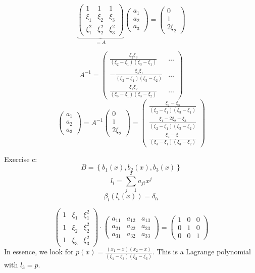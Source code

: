 \documentclass[a4paper]{article}
\theoremstyle{definition}
\newcommand\set[1]{\left\{#1\right\}}
\begin{document}
\[
  \underbrace{\begin{pmatrix}
    1 & 1 & 1 \\
    \xi_1 & \xi_2 & \xi_3 \\
    \xi_1^2 & \xi_2^2 & \xi_3^2
  \end{pmatrix}}_{= A}
  \begin{pmatrix} a_1 \\ a_2 \\ a_3 \end{pmatrix}
  = \begin{pmatrix} 0 \\ 1 \\ 2\xi_2 \end{pmatrix}
\]


\[
  A^{-1} = \begin{pmatrix}
    \frac{\xi_2 \xi_3}{(\xi_2 - \xi_1)(\xi_3 - \xi_1)} & \dots \\
    -\frac{\xi_3 \xi_1}{(\xi_2 - \xi_1)(\xi_3 - \xi_2)} & \dots \\
    \frac{\xi_1 \xi_2}{(\xi_3 - \xi_1)(\xi_3 - \xi_2)} & \dots
  \end{pmatrix}
\]
\[
  \begin{pmatrix} a_1 \\ a_2 \\ a_3 \end{pmatrix}
  = A^{-1} \begin{pmatrix} 0 \\ 1 \\ 2 \xi_2 \end{pmatrix}
  = \begin{pmatrix}
    \frac{\xi_2 - \xi_3}{(\xi_2 - \xi_1)(\xi_3 - \xi_1)} \\
    \frac{\xi_1 - 2\xi_2 + \xi_3}{(\xi_2 - \xi_1)(\xi_3 - \xi_2)} \\
    \frac{\xi_2 - \xi_1}{(\xi_3 - \xi_1)(\xi_3 - \xi_2)}
  \end{pmatrix}
\]

Exercise c:
\[ B = \set{b_1(x), b_2(x), b_3(x)} \]
\[ l_i = \sum_{j=1}^2 a_{ji} x^j \]
\[ \beta_l(l_i(x)) = \delta_{li} \]

\[
  \begin{pmatrix}
    1 & \xi_1 & \xi_1^2 \\
    1 & \xi_2 & \xi_2^2 \\
    1 & \xi_3 & \xi_3^2
  \end{pmatrix} \cdot
  \begin{pmatrix}
    a_{11} & a_{12} & a_{13} \\
    a_{21} & a_{22} & a_{23} \\
    a_{31} & a_{32} & a_{33}
  \end{pmatrix}
  = \begin{pmatrix}
    1 & 0 & 0 \\
    0 & 1 & 0 \\
    0 & 0 & 1
  \end{pmatrix}
\]
In essence, we look for $p(x) = \frac{(x_1 - x)(x_2 - x)}{(\xi_1 - \xi_3)(\xi_2 - \xi_3)}$.
This is a Lagrange polynomial with $l_3 = p$.
\end{document}
